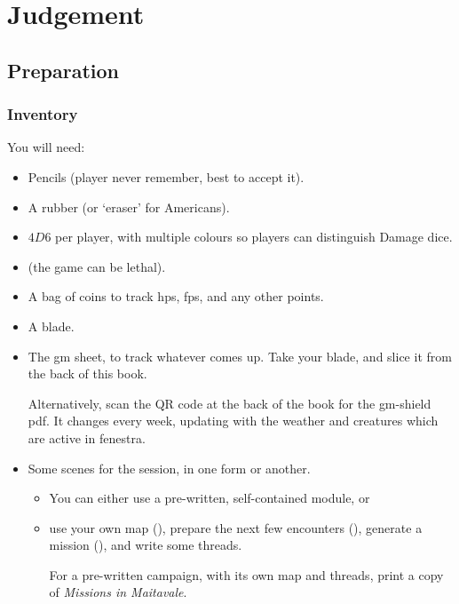 \chapter[Bastion of Judgement]{Judgement}
\label{judgement}

\section{Preparation}

\begin{multicols}{2}

\subsection{Inventory}

You will need:

\begin{itemize}
  \item
  Pencils (player never remember, best to accept it).
  \item
  A rubber (or `eraser' for Americans).
  \item
  $4D6$ per player, with multiple colours so players can distinguish Damage dice.
  \item
  \iftoggle{stories}{
    A boat-load of character sheets
  }{
    Some pre-made characters, including spares
  } (the game can be lethal).
  \item
  A bag of coins to track \glspl{hp}, \glspl{fp}, and any other points.
  \item
  A blade.
  \item
  The \gls{gm} sheet, to track whatever comes up.
  Take your blade, and slice it from the back of this book.

  Alternatively, scan the QR code at the back of the book for the \gls{gm}-shield \gls{pdf}.
  It changes every week, updating with the weather and creatures which are active in \gls{fenestra}.
  \item
  Some scenes for the session, in one form or another.
  \begin{itemize}
    \item
    You can either use a pre-written, self-contained module, or
    \item
    use your own map (),
    prepare the next few encounters (),
    generate a mission (),
    and write some \glspl{thread}.

    For a pre-written \gls{campaign}, with its own map and \glspl{thread}, print a copy of \textit{Missions in Maitavale}.
  \end{itemize}
\end{itemize}


\end{multicols}
